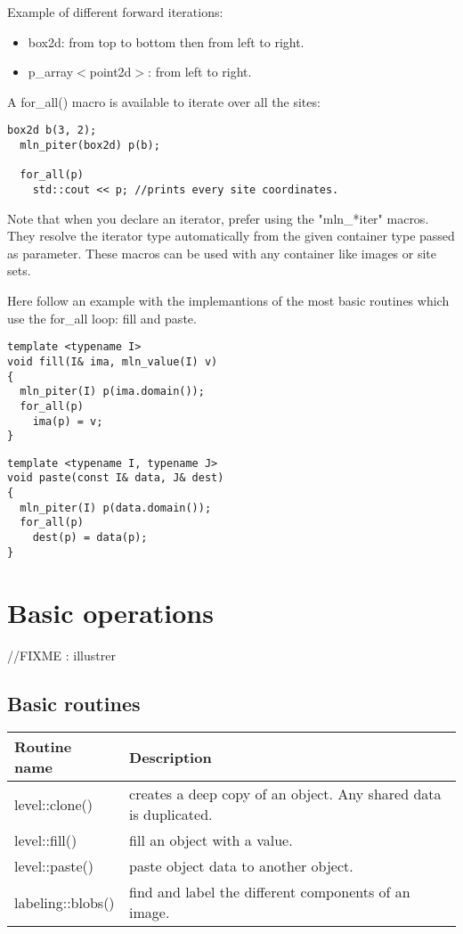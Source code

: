 \documentclass{report}
\begin{document}
Example of different forward iterations:
\begin{itemize}
  \item box2d: from top to bottom then from left to right.
  \item p\_array$<$point2d$>$: from left to right.
\end{itemize}

A for\_all() macro is available to iterate over all the sites: \\

\begin{lstlisting}[frame=single]
  box2d b(3, 2);
  mln_piter(box2d) p(b);

  for_all(p)
    std::cout << p; //prints every site coordinates.
\end{lstlisting}

Note that when you declare an iterator, prefer using the "mln\_*iter" macros.
They resolve the iterator type automatically from the given container type
passed as parameter. These macros can be used with any container like images or
site sets.

Here follow an example with the implemantions of the most basic routines which use the for\_all
loop: fill and paste.

\begin{lstlisting}[frame=single]
template <typename I>
void fill(I& ima, mln_value(I) v)
{
  mln_piter(I) p(ima.domain());
  for_all(p)
    ima(p) = v;
}
\end{lstlisting}


\begin{lstlisting}[frame=single]
template <typename I, typename J>
void paste(const I& data, J& dest)
{
  mln_piter(I) p(data.domain());
  for_all(p)
    dest(p) = data(p);
}
\end{lstlisting}

\clearpage
\newpage
\chapter{Basic operations}
//FIXME : illustrer

\section{Basic routines}
\begin{tabular}{|l|p{8cm}|}
\hline
Routine name & Description \\ \hline
level::clone() & creates a deep copy of an object. Any shared data is
duplicated. \\ \hline

level::fill() & fill an object with a value. \\ \hline

level::paste() & paste object data to another object. \\ \hline

labeling::blobs() & find and label the different components of an image. \\
\hline
\end{tabular} \\
\end{document}
